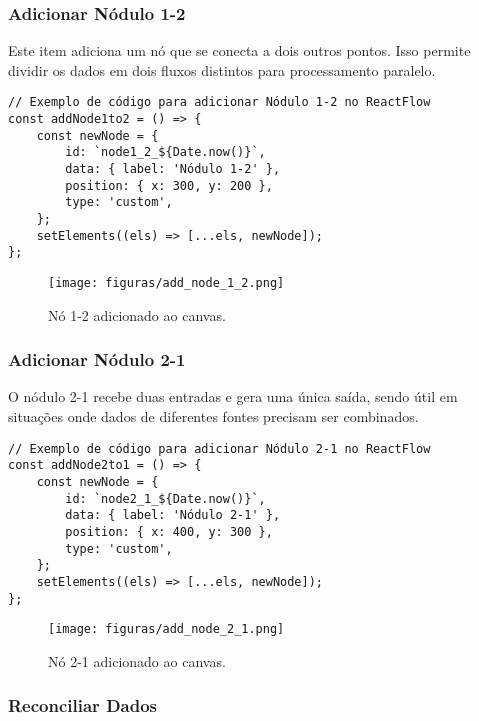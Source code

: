 \subsubsection{Adicionar Nódulo 1-2}

Este item adiciona um nó que se conecta a dois outros pontos. Isso permite dividir os dados em dois fluxos distintos para processamento paralelo.

\begin{verbatim}
// Exemplo de código para adicionar Nódulo 1-2 no ReactFlow
const addNode1to2 = () => {
    const newNode = {
        id: `node1_2_${Date.now()}`,
        data: { label: 'Nódulo 1-2' },
        position: { x: 300, y: 200 },
        type: 'custom',
    };
    setElements((els) => [...els, newNode]);
};
\end{verbatim}

\begin{figure}[htbp]
    \centering
    \texttt{[image: figuras/add\_node\_1\_2.png]}
    \caption{Nó 1-2 adicionado ao canvas.}
    \label{Fig:AddNode1to2}
\end{figure}

\subsubsection{Adicionar Nódulo 2-1}

O nódulo 2-1 recebe duas entradas e gera uma única saída, sendo útil em situações onde dados de diferentes fontes precisam ser combinados.

\begin{verbatim}
// Exemplo de código para adicionar Nódulo 2-1 no ReactFlow
const addNode2to1 = () => {
    const newNode = {
        id: `node2_1_${Date.now()}`,
        data: { label: 'Nódulo 2-1' },
        position: { x: 400, y: 300 },
        type: 'custom',
    };
    setElements((els) => [...els, newNode]);
};
\end{verbatim}

\begin{figure}[htbp]
    \centering
    \texttt{[image: figuras/add\_node\_2\_1.png]}
    \caption{Nó 2-1 adicionado ao canvas.}
    \label{Fig:AddNode2to1}
\end{figure}

\subsubsection{Reconciliar Dados}

